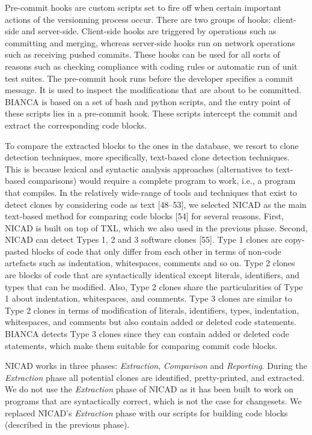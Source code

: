 \documentclass[conference]{IEEEtran}
\begin{document}
Pre-commit hooks are custom scripts set to fire off when certain
important actions of the versionning process occur. There are two groups
of hooks: client-side and server-side. Client-side hooks are triggered
by operations such as committing and merging, whereas server-side hooks
run on network operations such as receiving pushed commits. These hooks
can be used for all sorts of reasons such as checking compliance with
coding rules or automatic run of unit test suites. The pre-commit hook
runs before the developer specifies a commit message. It is used to
inspect the modifications that are about to be committed. BIANCA is
based on a set of bash and python scripts, and the entry point of these
scripts lies in a pre-commit hook. These scripts intercept the commit
and extract the corresponding code blocks.

To compare the extracted blocks to the ones in the database, we resort
to clone detection techniques, more specifically, text-based clone
detection techniques. This is because lexical and syntactic analysis
approaches (alternatives to text-based comparisons) would require a
complete program to work, i.e., a program that compiles. In the
relatively wide-range of tools and techniques that exist to detect
clones by considering code as text {[}48--53{]}, we selected NICAD as
the main text-based method for comparing code blocks {[}54{]} for
several reasons. First, NICAD is built on top of TXL, which we also used
in the previous phase. Second, NICAD can detect Types 1, 2 and 3
software clones {[}55{]}. Type 1 clones are copy-pasted blocks of code
that only differ from each other in terms of non-code artefacts such as
indentation, whitespaces, comments and so on. Type 2 clones are blocks
of code that are syntactically identical except literals, identifiers,
and types that can be modified. Also, Type 2 clones share the
particularities of Type 1 about indentation, whitespaces, and comments.
Type 3 clones are similar to Type 2 clones in terms of modification of
literals, identifiers, types, indentation, whitespaces, and comments but
also contain added or deleted code statements. BIANCA detects Type 3
clones since they can contain added or deleted code statements, which
make them suitable for comparing commit code blocks.

NICAD works in three phases: \emph{Extraction}, \emph{Comparison} and
\emph{Reporting}. During the \emph{Extraction} phase all potential
clones are identified, pretty-printed, and extracted. We do not use the
\emph{Extraction} phase of NICAD as it has been built to work on
programs that are syntactically correct, which is not the case for
changesets. We replaced NICAD's \emph{Extraction} phase with our scripts
for building code blocks (described in the previous phase).
\end{document}
